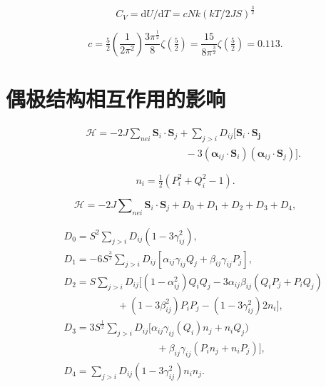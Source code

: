 \documentclass{article}
\begin{document}
\begin{equation} \label{eq:31}
C_V=\mathrm{d}U/\mathrm{d}T=cNk(kT/2JS)^{\frac{3}{2}}
\end{equation}

\begin{equation} \label{eq:32}
c=\tfrac{5}{2}\left(\frac{1}{2\pi^2}\right)\frac{3\pi^{\frac{1}{2}}}{8}\zeta(\tfrac{5}{2})=\frac{15}{8\pi^{\frac{3}{2}}}\zeta(\tfrac{5}{2})=0.113.
\end{equation}



\section{偶极结构相互作用的影响} \label{sec:5}

\begin{eqnarray} \label{eq:33}
&&\mathcal{H}=-2J\sum\nolimits_{\mathit{nei}}\mathbf{S}_i\cdot\mathbf{S}_j+\sum\nolimits_{j>i}D_{ij}[\mathbf{S}_i\cdot\mathbf{S_j}\nonumber\\
&&\phantom{~~~~~~~~~~~~~~~~~~~~~~~~~~~~~~~~~~~~~~~~~~~~~}-3(\boldsymbol{\alpha}_{ij}\cdot\mathbf{S}_i)(\boldsymbol{\alpha}_{ij}\cdot\mathbf{S}_j)].
\end{eqnarray}

\begin{equation} \label{eq:34}
n_i=\tfrac{1}{2}(P_i^2+Q_i^2-1).
\end{equation}


\begin{equation} \label{eq:35}
\mathcal{H}=-2J\sum\nolimits_{\mathit{nei}}\mathbf{S}_i\cdot\mathbf{S}_j+D_0+D_1+D_2+D_3+D_4,
\end{equation}

\begin{eqnarray}
&&D_0=S^2\sum\nolimits_{j>i}D_{ij}(1-3\gamma_{ij}^2),\label{eq:36}\\
&&D_1=-6S^{\frac{3}{2}}\sum\nolimits_{j>i}D_{ij}[\alpha_{ij}\gamma_{ij}Q_j+\beta_{ij}\gamma_{ij}P_j],\label{eq:37}\\
&&D_2=S\sum\nolimits_{j>i}D_{ij}[(1-\alpha_{ij}^2)Q_iQ_j-3\alpha_{ij}\beta_{ij}(Q_iP_j+P_iQ_j)\nonumber\\
&&\phantom{~~~~~~~~~~~~~~~~~~~~~~~~}+(1-3\beta_{ij}^2)P_iP_j-(1-3\gamma_{ij}^2)2n_i],\label{eq:38}\\
&&D_3=3S^{\frac{1}{2}}\sum\nolimits_{j>i}D_{ij}[\alpha_{ij}\gamma_{ij}(Q_i)n_j+n_iQ_j)\nonumber\\
&&\phantom{~~~~~~~~~~~~~~~~~~~~~~~~~~~~~~~~~~~~~~~~~~}+\beta_{ij}\gamma_{ij}(P_in_j+n_iP_j)], \label{eq:39}\\
&&D_4=\sum\nolimits_{j>i}D_{ij}(1-3\gamma_{ij}^2)n_in_j.\label{eq:40}
\end{eqnarray}
\end{document}
